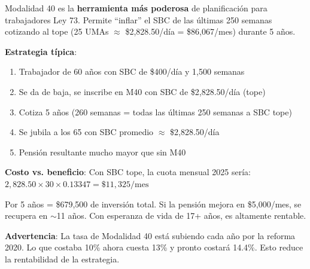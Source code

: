 \documentclass[11pt,a4paper]{report}
\begin{document}
\begin{tcolorbox}[colback=green!5!white, colframe=green!50!black, title=\textbf{Intuici\'on}]
Modalidad 40 es la \textbf{herramienta m\'as poderosa} de planificaci\'on para trabajadores Ley 73. Permite ``inflar'' el SBC de las \'ultimas 250 semanas cotizando al tope (25 UMAs $\approx$ \$2,828.50/d\'ia = \$86,067/mes) durante 5 a\~nos.

\textbf{Estrategia t\'ipica}:
\begin{enumerate}[nosep]
\item Trabajador de 60 a\~nos con SBC de \$400/d\'ia y 1,500 semanas
\item Se da de baja, se inscribe en M40 con SBC de \$2,828.50/d\'ia (tope)
\item Cotiza 5 a\~nos (260 semanas = todas las \'ultimas 250 semanas a SBC tope)
\item Se jubila a los 65 con SBC promedio $\approx$ \$2,828.50/d\'ia
\item Pensi\'on resultante mucho mayor que sin M40
\end{enumerate}

\textbf{Costo vs. beneficio}: Con SBC tope, la cuota mensual 2025 ser\'ia:
$2,828.50 \times 30 \times 0.13347 = \$11,325/\text{mes}$

Por 5 a\~nos = \$679,500 de inversi\'on total. Si la pensi\'on mejora en \$5,000/mes, se recupera en $\sim$11 a\~nos. Con esperanza de vida de 17+ a\~nos, es altamente rentable.

\textbf{Advertencia}: La tasa de Modalidad 40 est\'a subiendo cada a\~no por la reforma 2020. Lo que costaba 10\% ahora cuesta 13\% y pronto costar\'a 14.4\%. Esto reduce la rentabilidad de la estrategia.
\end{tcolorbox}
\end{document}
